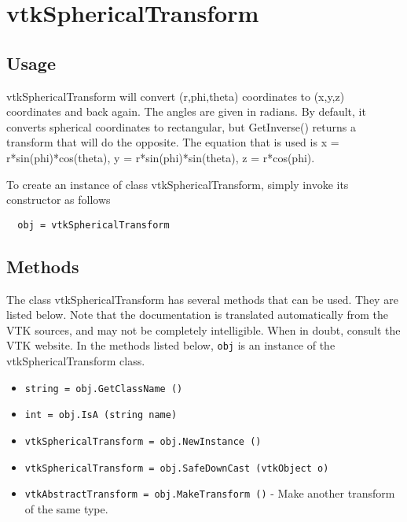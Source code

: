 \section{vtkSphericalTransform}

\subsection{Usage}

 vtkSphericalTransform will convert (r,phi,theta) coordinates to 
 (x,y,z) coordinates and back again.  The angles are given in radians.
 By default, it converts spherical coordinates to rectangular, but
 GetInverse() returns a transform that will do the opposite.  The equation
 that is used is x = r*sin(phi)*cos(theta), y = r*sin(phi)*sin(theta),
 z = r*cos(phi).

To create an instance of class vtkSphericalTransform, simply
invoke its constructor as follows
\begin{verbatim}
  obj = vtkSphericalTransform
\end{verbatim}
\subsection{Methods}

The class vtkSphericalTransform has several methods that can be used.
  They are listed below.
Note that the documentation is translated automatically from the VTK sources,
and may not be completely intelligible.  When in doubt, consult the VTK website.
In the methods listed below, \verb|obj| is an instance of the vtkSphericalTransform class.
\begin{itemize}
\item  \verb|string = obj.GetClassName ()|

\item  \verb|int = obj.IsA (string name)|

\item  \verb|vtkSphericalTransform = obj.NewInstance ()|

\item  \verb|vtkSphericalTransform = obj.SafeDownCast (vtkObject o)|

\item  \verb|vtkAbstractTransform = obj.MakeTransform ()| -  Make another transform of the same type.

\end{itemize}
